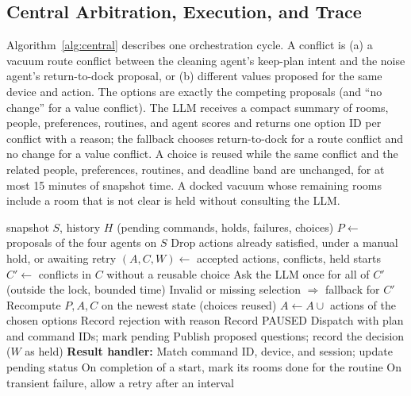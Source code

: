 \documentclass[conference]{IEEEtran}
\begin{document}
\subsection{Central Arbitration, Execution, and Trace}
\label{sec:central}

Algorithm~\ref{alg:central} describes one orchestration cycle. A
conflict is (a) a vacuum route conflict between the cleaning agent's
keep-plan intent and the noise agent's return-to-dock proposal, or
(b) different values proposed for the same device and action. The
options are exactly the competing proposals (and ``no change'' for a
value conflict). The LLM receives a compact summary of rooms, people,
preferences, routines, and agent scores and returns one option ID
per conflict with a reason; the fallback chooses return-to-dock for a
route conflict and no change for a value conflict. A choice is reused
while the same conflict and the related people, preferences,
routines, and deadline band are unchanged, for at most 15 minutes of
snapshot time. A docked vacuum whose remaining rooms include a room that is not
clear is held without consulting the LLM.

\begin{algorithm}[!tbp]
\caption{Validated orchestration cycle}
\label{alg:central}
\footnotesize
\begin{algorithmic}[1]
\Require snapshot $S$, history $H$ (pending commands, holds, failures, choices)
\State $P \gets$ proposals of the four agents on $S$
\State Drop actions already satisfied, under a manual hold, or awaiting retry
\State $(A, C, W) \gets$ accepted actions, conflicts, held starts
\State $C' \gets$ conflicts in $C$ without a reusable choice
  \State Ask the LLM once for all of $C'$ (outside the lock, bounded time)
  \State Invalid or missing selection $\Rightarrow$ fallback for $C'$
\EndIf
{}
  \State Recompute $P, A, C$ on the newest state (choices reused)
\EndIf
\State $A \gets A \cup$ actions of the chosen options
    \State Record rejection with reason
    \State Record PAUSED
  \Else
    \State Dispatch with plan and command IDs; mark pending
  \EndIf
\EndFor
\State Publish proposed questions; record the decision ($W$ as held)
\Statex \textbf{Result handler:}
\State Match command ID, device, and session; update pending status
\State On completion of a start, mark its rooms done for the routine
\State On transient failure, allow a retry after an interval
\end{algorithmic}
\end{algorithm}
\end{document}
